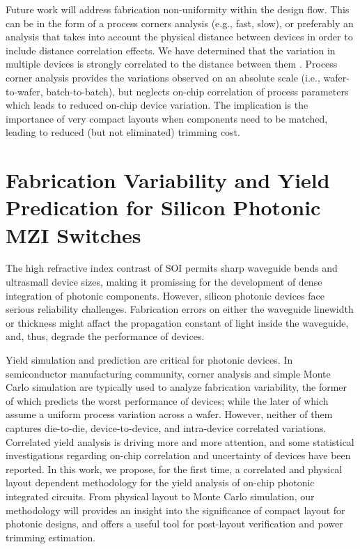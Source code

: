 \documentclass[journal]{spie}
\begin{document}
Future work will address fabrication non-uniformity within the design flow.  This can be in the form of a process corners analysis (e.g., fast, slow), or preferably an analysis that takes into account the physical distance between devices in order to include distance correlation effects.  We have determined that the variation in multiple devices is strongly correlated to the distance between them \cite{chrostowski2014impact}.  Process corner analysis provides the variations observed on an absolute scale (i.e., wafer-to-wafer, batch-to-batch), but neglects on-chip correlation of process parameters which leads to reduced on-chip device variation.  The implication is the importance of very compact layouts when components need to be matched, leading to reduced (but not eliminated) trimming cost.  



\graphicspath{{../figs_chris/}}


\section{Fabrication Variability and Yield Predication for Silicon Photonic MZI Switches}
\label{sec:variability}
The high refractive index contrast of SOI permits sharp waveguide bends and ultrasmall device sizes, making it promissing for the development of dense integration of photonic components. However, silicon photonic devices face serious reliability challenges. Fabrication errors on either the waveguide linewidth or thickness might affact the propagation constant of light inside the waveguide, and, thus, degrade the performance of devices. 

Yield simulation and prediction are critical for photonic devices. In semiconductor manufacturing community, corner analysis and simple Monte Carlo simulation are typically used to analyze fabrication variability, the former of which predicts the worst performance of devices; while the later of which assume a uniform process variation across a wafer. However, neither of them captures die-to-die, device-to-device, and intra-device correlated variations. Correlated yield analysis is driving more and more attention, and some statistical investigations regarding on-chip correlation \cite{lukas14:OFC,hochberg:wafer} and uncertainty of devices \cite{MIT:uncertainty} have been reported. In this work, we propose, for the first time, a correlated and physical layout dependent methodology for the yield analysis of on-chip photonic integrated circuits. From physical layout to Monte Carlo simulation, our methodology will provides an insight into the significance of compact layout for photonic designs, and offers a useful tool for post-layout verification and power trimming estimation.
\end{document}

